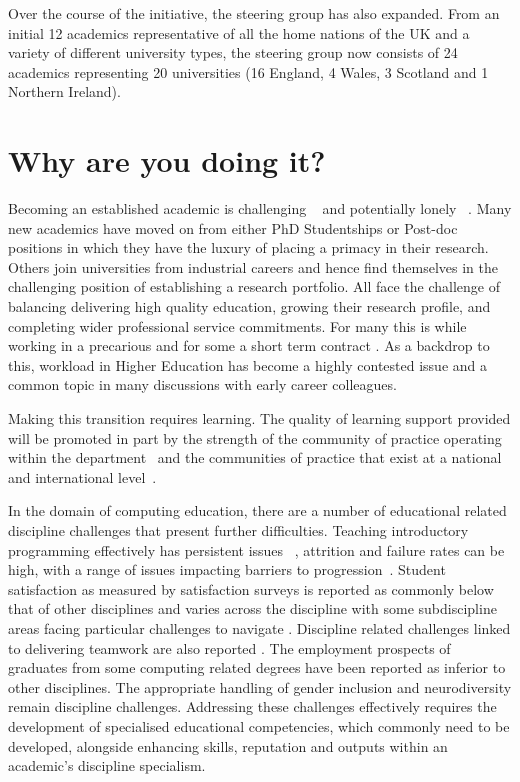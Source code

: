 \documentclass[sigconf]{acmart}
\begin{document}
Over the course of the initiative, the steering group has also
expanded. From an initial 12 academics representative of all the home
nations of the UK and a variety of different university types, the
steering group now consists of 24 academics representing 20
universities (16 England, 4 Wales, 3 Scotland and 1 Northern Ireland).

\section{Why are you doing it?}
\label{sec:Why}
Becoming an established academic is challenging ~\cite{Thomas2015} and
potentially lonely ~\cite{Foote2009}. Many new academics have moved on
from either PhD Studentships or Post-doc positions in which they have
the luxury of placing a primacy in their research. Others join
universities from industrial careers and hence find themselves in the
challenging position of establishing a research portfolio. All face
the challenge of balancing delivering high quality education, growing
their research profile, and completing wider professional service
commitments. For many this is while working in a precarious and for
some a short term contract \cite{UCU,JaffeS}. As a backdrop to this,
workload in Higher Education has become a highly contested issue
\cite{UCU2016}and a common topic in many discussions with early career
colleagues.

Making this transition requires learning. The quality of learning
support provided will be promoted in part by the strength of the
community of practice operating within the
department~\cite{Bolander2008} and the communities of practice that
exist at a national and international level~\cite{Thomas2015}.

In the domain of computing education, there are a number of
educational related discipline challenges that present further
difficulties. Teaching introductory programming effectively has
persistent issues
~\cite{davenport-et-al:latice2016,murphy-et-al:programming2017,simon-et-al:sigcse2018},
attrition and failure rates can be high, with a range of issues
impacting barriers to
progression~\cite{Watson:2014:FRI:2591708.2591749}. Student
satisfaction as measured by satisfaction surveys is reported as
commonly below that of other disciplines \cite{Sinclair2015} and
varies across the discipline with some subdiscipline areas facing
particular challenges to navigate \cite{Knutas2021}. Discipline
related challenges linked to delivering teamwork are also reported
\cite{Gordon2010,Phillips2021}. The employment prospects of graduates
from some computing related degrees have been reported as inferior to
other disciplines\cite{shadbolt2016shadbolt}. The appropriate handling
of gender inclusion \cite{Winter2021} and neurodiversity
\cite{Stuurman2109} remain discipline challenges. Addressing these
challenges effectively requires the development of specialised
educational competencies, which commonly need to be developed,
alongside enhancing skills, reputation and outputs within an
academic’s discipline specialism.
\end{document}
